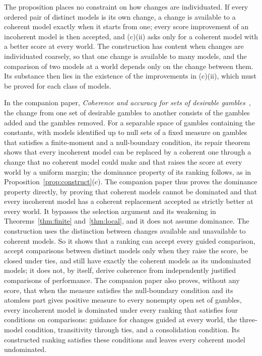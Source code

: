 \documentclass[11pt]{article}
\theoremstyle{definition}
\theoremstyle{remark}
\begin{document}
The proposition places no constraint on how changes are individuated. If every ordered pair of distinct models is its own change, a change is available to a coherent model exactly when it starts from one; every score improvement of an incoherent model is then accepted, and (c)(ii) asks only for a coherent model with a better score at every world. The construction has content when changes are individuated coarsely, so that one change is available to many models, and the comparison of two models at a world depends only on the change between them. Its substance then lies in the existence of the improvements in (c)(ii), which must be proved for each class of models.

In the companion paper, \emph{Coherence and accuracy for sets of desirable gambles}~\cite{KCM}, the change from one set of desirable gambles to another consists of the gambles added and the gambles removed. For a separable space of gambles containing the constants, with models identified up to null sets of a fixed measure on gambles that satisfies a finite-moment and a null-boundary condition, its repair theorem shows that every incoherent model can be replaced by a coherent one through a change that no coherent model could make and that raises the score at every world by a uniform margin; the dominance property of its ranking follows, as in Proposition~\ref{prop:construct}(c). The companion paper thus proves the dominance property directly, by proving that coherent models cannot be dominated and that every incoherent model has a coherent replacement accepted as strictly better at every world. It bypasses the selection argument and its weakening in Theorems~\ref{thm:finite} and~\ref{thm:local}, and it does not assume dominance. The construction uses the distinction between changes available and unavailable to coherent models. So it shows that a ranking can accept every guided comparison, accept comparisons between distinct models only when they raise the score, be closed under ties, and still have exactly the coherent models as its undominated models; it does not, by itself, derive coherence from independently justified comparisons of performance. The companion paper also proves, without any score, that when the measure satisfies the null-boundary condition and its atomless part gives positive measure to every nonempty open set of gambles, every incoherent model is dominated under every ranking that satisfies four conditions on comparisons: guidance for changes guided at every world, the three-model condition, transitivity through ties, and a consolidation condition. Its constructed ranking satisfies these conditions and leaves every coherent model undominated.
\end{document}
